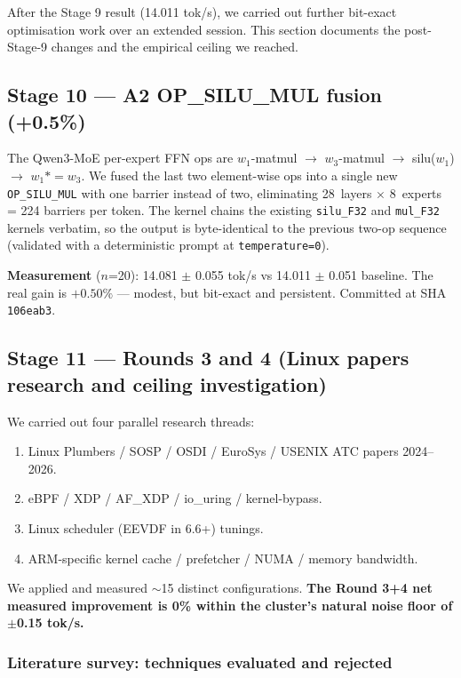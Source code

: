 \documentclass[10pt,a4paper]{article}
\begin{document}
After the Stage 9 result (14.011 tok/s), we carried out further bit-exact optimisation work over an extended session. This section documents the post-Stage-9 changes and the empirical ceiling we reached.

\subsection{Stage 10 --- A2 OP\_SILU\_MUL fusion (+0.5\%)}

The Qwen3-MoE per-expert FFN ops are $w_1$-matmul $\to$ $w_3$-matmul $\to$ silu($w_1$) $\to$ $w_1 \mathbin{*}{=} w_3$. We fused the last two element-wise ops into a single new \texttt{OP\_SILU\_MUL} with one barrier instead of two, eliminating 28~layers $\times$ 8~experts = 224 barriers per token. The kernel chains the existing \texttt{silu\_F32} and \texttt{mul\_F32} kernels verbatim, so the output is byte-identical to the previous two-op sequence (validated with a deterministic prompt at \texttt{temperature=0}).

\textbf{Measurement} ($n$=20): 14.081 $\pm$ 0.055 tok/s vs 14.011 $\pm$ 0.051 baseline. The real gain is $+0.50\%$ --- modest, but bit-exact and persistent. Committed at SHA \texttt{106eab3}.

\subsection{Stage 11 --- Rounds 3 and 4 (Linux papers research and ceiling investigation)}

We carried out four parallel research threads:
\begin{enumerate}
  \item Linux Plumbers / SOSP / OSDI / EuroSys / USENIX ATC papers 2024--2026.
  \item eBPF / XDP / AF\_XDP / io\_uring / kernel-bypass.
  \item Linux scheduler (EEVDF in 6.6+) tunings.
  \item ARM-specific kernel cache / prefetcher / NUMA / memory bandwidth.
\end{enumerate}

We applied and measured $\sim$15 distinct configurations. \textbf{The Round 3+4 net measured improvement is 0\% within the cluster's natural noise floor of $\pm$0.15 tok/s.}

\subsubsection{Literature survey: techniques evaluated and rejected}
\end{document}
